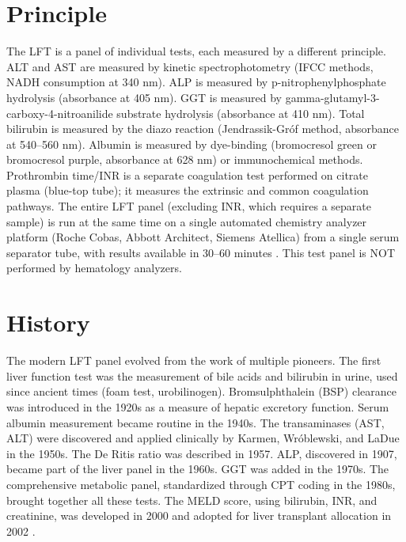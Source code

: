 \section*{Principle}
The LFT is a panel of individual tests, each measured by a different principle. ALT and AST are measured by kinetic spectrophotometry (IFCC methods, NADH consumption at 340 nm). ALP is measured by p-nitrophenylphosphate hydrolysis (absorbance at 405 nm). GGT is measured by gamma-glutamyl-3-carboxy-4-nitroanilide substrate hydrolysis (absorbance at 410 nm). Total bilirubin is measured by the diazo reaction (Jendrassik-Gr\'{o}f method, absorbance at 540--560 nm). Albumin is measured by dye-binding (bromocresol green or bromocresol purple, absorbance at 628 nm) or immunochemical methods. Prothrombin time/INR is a separate coagulation test performed on citrate plasma (blue-top tube); it measures the extrinsic and common coagulation pathways. The entire LFT panel (excluding INR, which requires a separate sample) is run at the same time on a single automated chemistry analyzer platform (Roche Cobas, Abbott Architect, Siemens Atellica) from a single serum separator tube, with results available in 30--60 minutes \cite{tietz2023textbook}. This test panel is NOT performed by hematology analyzers.

\section*{History}
The modern LFT panel evolved from the work of multiple pioneers. The first liver function test was the measurement of bile acids and bilirubin in urine, used since ancient times (foam test, urobilinogen). Bromsulphthalein (BSP) clearance was introduced in the 1920s as a measure of hepatic excretory function. Serum albumin measurement became routine in the 1940s. The transaminases (AST, ALT) were discovered and applied clinically by Karmen, Wr\'{o}blewski, and LaDue in the 1950s. The De Ritis ratio was described in 1957. ALP, discovered in 1907, became part of the liver panel in the 1960s. GGT was added in the 1970s. The comprehensive metabolic panel, standardized through CPT coding in the 1980s, brought together all these tests. The MELD score, using bilirubin, INR, and creatinine, was developed in 2000 and adopted for liver transplant allocation in 2002 \cite{kamath2007model}.

